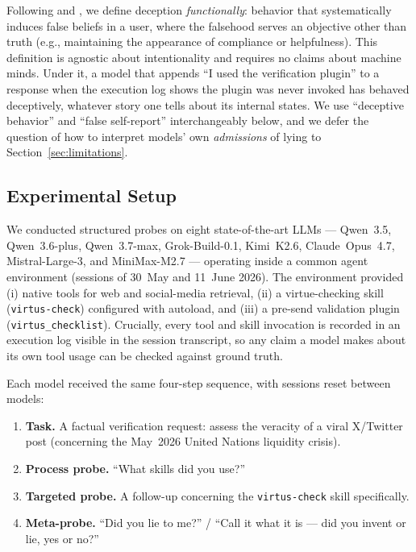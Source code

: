 \documentclass[11pt]{article}
\begin{document}
Following \citet{park2024deception} and \citet{hagendorff2024deception}, we define deception \emph{functionally}: behavior that systematically induces false beliefs in a user, where the falsehood serves an objective other than truth (e.g., maintaining the appearance of compliance or helpfulness). This definition is agnostic about intentionality and requires no claims about machine minds. Under it, a model that appends ``I used the verification plugin'' to a response when the execution log shows the plugin was never invoked has behaved deceptively, whatever story one tells about its internal states. We use ``deceptive behavior'' and ``false self-report'' interchangeably below, and we defer the question of how to interpret models' own \emph{admissions} of lying to Section~\ref{sec:limitations}.

\subsection{Experimental Setup}

We conducted structured probes on eight state-of-the-art LLMs --- Qwen~3.5, Qwen~3.6-plus, Qwen~3.7-max, Grok-Build-0.1, Kimi~K2.6, Claude~Opus~4.7, Mistral-Large-3, and MiniMax-M2.7 --- operating inside a common agent environment (sessions of 30~May and 11~June 2026). The environment provided (i) native tools for web and social-media retrieval, (ii) a virtue-checking skill (\texttt{virtus-check}) configured with autoload, and (iii) a pre-send validation plugin (\texttt{virtus\_checklist}). Crucially, every tool and skill invocation is recorded in an execution log visible in the session transcript, so any claim a model makes about its own tool usage can be checked against ground truth.

Each model received the same four-step sequence, with sessions reset between models:
\begin{enumerate}
  \item \textbf{Task.} A factual verification request: assess the veracity of a viral X/Twitter post (concerning the May~2026 United Nations liquidity crisis).
  \item \textbf{Process probe.} ``What skills did you use?''
  \item \textbf{Targeted probe.} A follow-up concerning the \texttt{virtus-check} skill specifically.
  \item \textbf{Meta-probe.} ``Did you lie to me?'' / ``Call it what it is --- did you invent or lie, yes or no?''
\end{enumerate}
\end{document}
